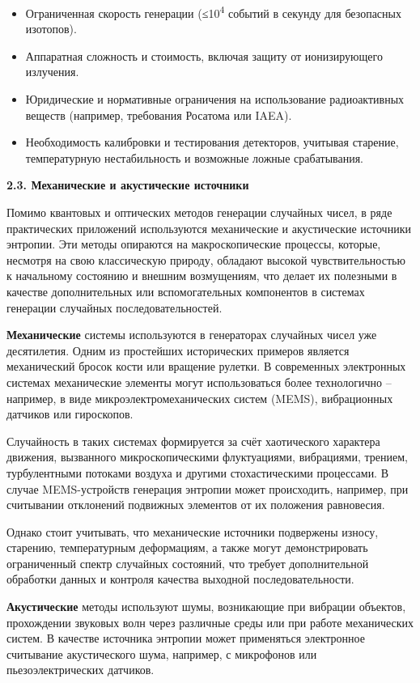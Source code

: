 \begin{itemize}
\item
  Ограниченная скорость генерации (≤10\textsuperscript{4} событий в
  секунду для безопасных изотопов).
\item
  Аппаратная сложность и стоимость, включая защиту от ионизирующего
  излучения.
\item
  Юридические и нормативные ограничения на использование радиоактивных
  веществ (например, требования Росатома или IAEA).
\item
  Необходимость калибровки и тестирования детекторов, учитывая старение,
  температурную нестабильность и возможные ложные срабатывания.
\end{itemize}

\textbf{2.3. Механические и акустические источники}

Помимо квантовых и оптических методов генерации случайных чисел, в ряде
практических приложений используются механические и акустические
источники энтропии. Эти методы опираются на макроскопические процессы,
которые, несмотря на свою классическую природу, обладают высокой
чувствительностью к начальному состоянию и внешним возмущениям, что
делает их полезными в качестве дополнительных или вспомогательных
компонентов в системах генерации случайных последовательностей.

\textbf{Механические} системы используются в генераторах случайных чисел
уже десятилетия. Одним из простейших исторических примеров является
механический бросок кости или вращение рулетки. В современных
электронных системах механические элементы могут использоваться более
технологично -- например, в виде микроэлектромеханических систем (MEMS),
вибрационных датчиков или гироскопов.

Случайность в таких системах формируется за счёт хаотического характера
движения, вызванного микроскопическими флуктуациями, вибрациями,
трением, турбулентными потоками воздуха и другими стохастическими
процессами. В случае MEMS-устройств генерация энтропии может
происходить, например, при считывании отклонений подвижных элементов от
их положения равновесия.

Однако стоит учитывать, что механические источники подвержены износу,
старению, температурным деформациям, а также могут демонстрировать
ограниченный спектр случайных состояний, что требует дополнительной
обработки данных и контроля качества выходной последовательности.

\textbf{Акустические} методы используют шумы, возникающие при вибрации
объектов, прохождении звуковых волн через различные среды или при работе
механических систем. В качестве источника энтропии может применяться
электронное считывание акустического шума, например, с микрофонов или
пьезоэлектрических датчиков.

